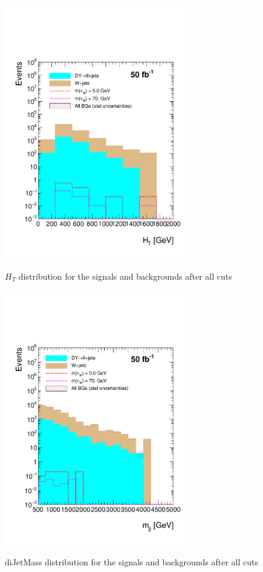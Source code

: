  \begin{figure}[h] 
 \centering
 \caption{$H_T$ distribution for the signals and backgrounds after all cuts}
 \includegraphics[width=0.7\textwidth]{./Capitulos/Analysis/AfterVBFCUTS/HT_MET_20} 
 \label{HT_VBF}
 \end{figure} 
 
  \begin{figure}[h] 
 \centering
 \caption{diJetMass distribution for the signals and backgrounds after all cuts}
 \includegraphics[width=0.7\textwidth]{./Capitulos/Analysis/AfterVBFCUTS/mjj_MET_20} 
 \label{diJetMass_VBF}
 \end{figure} 
 
